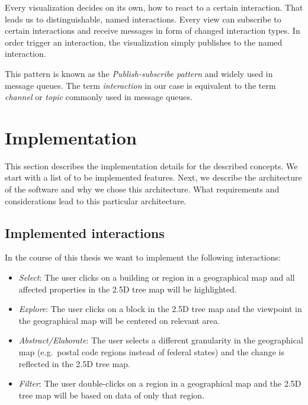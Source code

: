 \documentclass{article}
\newcommand{\tmap}{\textsc{2.5D} tree map}
\begin{document}
Every visualization decides on its own, how to react to a certain interaction.
That leads us to distinguishable, named interactions.
Every view can subscribe to certain interactions and receive messages in form of changed interaction types.
In order trigger an interaction, the visualization simply publishes to the named interaction.

This pattern is known as the \emph{Publish-subscribe pattern} and widely used in message queues.
The term \emph{interaction} in our case is equivalent to the term \emph{channel} or \emph{topic} commonly used in message queues.


\clearpage
\section{Implementation}

This section describes the implementation details for the described concepts.
We start with a list of to be implemented features.
Next, we describe the architecture of the software and why we chose this architecture.
What requirements and considerations lead to this particular architecture.


\subsection{Implemented interactions}

In the course of this thesis we want to implement the following interactions:
\begin{itemize}
  \item
    \emph{Select}: The user clicks on a building or region in a geographical map and all affected properties in the \tmap{} will be highlighted.
  \item
    \emph{Explore}: The user clicks on a block in the \tmap{} and the viewpoint in the geographical map will be centered on relevant area.
  \item
    \emph{Abstract/Elaborate}: The user selects a different granularity in the geographical map (e.g.\ postal code regions instead of federal states) and the change is reflected in the \tmap{}.
  \item
    \emph{Filter}: The user double-clicks on a region in a geographical map and the \tmap{} will be based on data of only that region.
\end{itemize}
\end{document}
